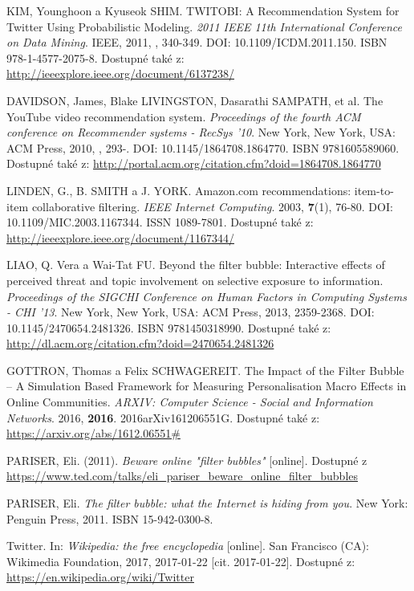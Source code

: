 \documentclass[12pt, a4paper]{article}
\numberwithin{equation}{section} 	%
\begin{document}
\newpage
\begin{thebibliography}{99}
    KIM, Younghoon a Kyuseok SHIM. TWITOBI: A Recommendation System for Twitter Using Probabilistic Modeling. \textit{2011 IEEE 11th International Conference on Data Mining}. IEEE, 2011, , 340-349. DOI: 10.1109/ICDM.2011.150. ISBN 978-1-4577-2075-8. Dostupné také z: \url{http://ieeexplore.ieee.org/document/6137238/}

    DAVIDSON, James, Blake LIVINGSTON, Dasarathi SAMPATH, et al. The YouTube video recommendation system. \textit{Proceedings of the fourth ACM conference on Recommender systems - RecSys '10}. New York, New York, USA: ACM Press, 2010, , 293-. DOI: 10.1145/1864708.1864770. ISBN 9781605589060. Dostupné také z: \url{http://portal.acm.org/citation.cfm?doid=1864708.1864770}

    LINDEN, G., B. SMITH a J. YORK. Amazon.com recommendations: item-to-item collaborative filtering. \textit{IEEE Internet Computing}. 2003, \textbf{7}(1), 76-80. DOI: 10.1109/MIC.2003.1167344. ISSN 1089-7801. Dostupné také z: \url{http://ieeexplore.ieee.org/document/1167344/}

    LIAO, Q. Vera a Wai-Tat FU. Beyond the filter bubble: Interactive effects of perceived threat and topic involvement on selective exposure to information. \textit{Proceedings of the SIGCHI Conference on Human Factors in Computing Systems - CHI '13}. New York, New York, USA: ACM Press, 2013, 2359-2368. DOI: 10.1145/2470654.2481326. ISBN 9781450318990. Dostupné také z: \url{http://dl.acm.org/citation.cfm?doid=2470654.2481326}

    GOTTRON, Thomas a Felix SCHWAGEREIT. The Impact of the Filter Bubble -- A Simulation Based Framework for Measuring Personalisation Macro Effects in Online Communities. \textit{ARXIV: Computer Science - Social and Information Networks}. 2016, \textbf{2016}. 2016arXiv161206551G. Dostupné také z: \url{https://arxiv.org/abs/1612.06551\#}

    PARISER, Eli. (2011). \textit{Beware online "filter bubbles"} [online]. Dostupné z \url{https://www.ted.com/talks/eli_pariser_beware_online_filter_bubbles}

    PARISER, Eli. \textit{The filter bubble: what the Internet is hiding from you}. New York: Penguin Press, 2011. ISBN 15-942-0300-8.

    Twitter. In: \textit{Wikipedia: the free encyclopedia} [online]. San Francisco (CA): Wikimedia Foundation, 2017, 2017-01-22 [cit. 2017-01-22]. Dostupné z: \url{https://en.wikipedia.org/wiki/Twitter}


\end{thebibliography}
\end{document}
